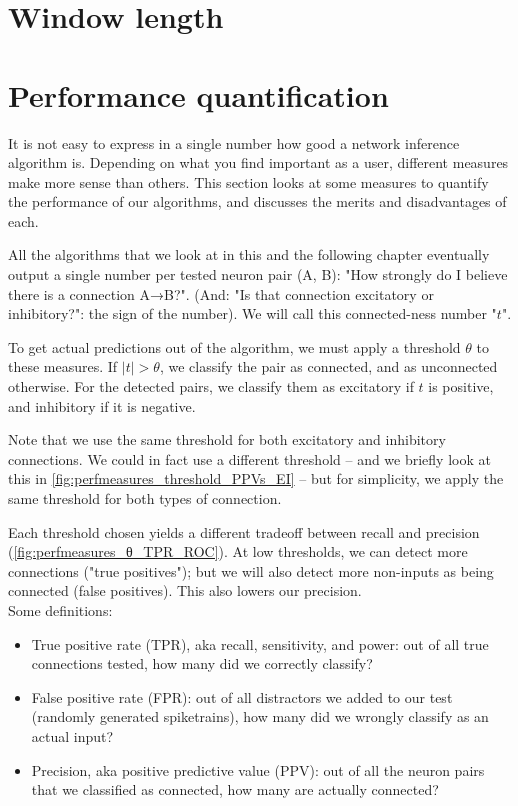 \section{Window length}





\FloatBarrier
\section{Performance quantification}
\label{sec:perf_quant}

It is not easy to express in a single number how good a network inference algorithm is. Depending on what you find important as a user, different measures make more sense than others. This section looks at some measures to quantify the performance of our algorithms, and discusses the merits and disadvantages of each.

All the algorithms that we look at in this and the following chapter eventually output a single number per tested neuron pair (A, B): "How strongly do I believe there is a connection A→B?". (And: "Is that connection excitatory or inhibitory?": the sign of the number). We will call this connected-ness number "$t$".

To get actual predictions out of the algorithm,
we must apply a threshold $θ$ to these measures. If $|t| > θ$, we classify the pair as connected, and as unconnected otherwise. For the detected pairs, we classify them as excitatory if $t$ is positive, and inhibitory if it is negative.

Note that we use the same threshold for both excitatory and inhibitory connections. We could in fact use a different threshold -- and we briefly look at this in \cref{fig:perfmeasures_threshold_PPVs_EI} -- but for simplicity, we apply the same threshold for both types of connection.

Each threshold chosen yields a different tradeoff between recall and precision (\cref{fig:perfmeasures_θ_TPR_ROC}). At low thresholds, we can detect more connections ("true positives"); but we will also detect more non-inputs as being connected (false positives). This also lowers our precision.\\
Some definitions:
\begin{itemize}
    \item True positive rate (TPR), aka recall, sensitivity, and power: out of all true connections tested, how many did we correctly classify?
    \item False positive rate (FPR): out of all distractors we added to our test (randomly generated spiketrains), how many did we wrongly classify as an actual input?
    \item Precision, aka positive predictive value (PPV): out of all the neuron pairs that we classified as connected, how many are actually connected?
\end{itemize}


